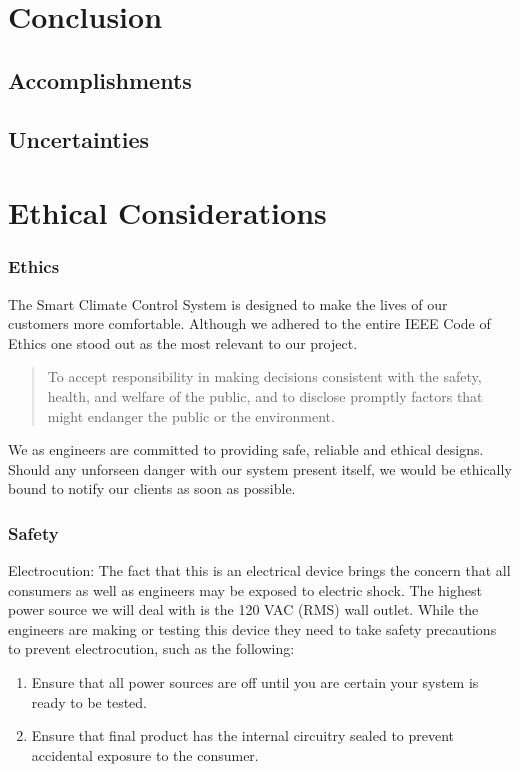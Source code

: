 \section{Conclusion}
\subsection{Accomplishments}
\subsection{Uncertainties}
\section{Ethical Considerations}
\subsubsection{Ethics}
The Smart Climate Control System is designed to make the lives of our customers more comfortable. Although we adhered to the entire IEEE Code of Ethics one stood out as the most relevant to our project.
\begin{quote}
To accept responsibility in making decisions consistent with the safety, health, and welfare of the public, and to disclose promptly factors that might endanger the public or the environment.
\end{quote}
We as engineers are committed to providing safe, reliable and ethical designs.  Should any unforseen danger with our system present itself, we would be ethically bound to notify our clients as soon as possible.

\subsubsection{Safety}
Electrocution: The fact that this is an electrical device brings the concern that all consumers as well as engineers may be exposed to electric shock. The highest power source we will deal with is the 120 VAC (RMS) wall outlet. While the engineers are making or testing this device they need to take safety precautions to prevent electrocution, such as the following:
\begin{enumerate}
\item
Ensure that all power sources are off until you are certain your system is ready to be tested.
\item
Ensure that final product has the internal circuitry sealed to prevent accidental exposure to the consumer.
\end{enumerate}

